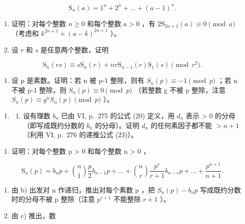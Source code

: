 \[
\mathrm{S} _ {n} (a) = 1 ^ {n} + 2 ^ {n} + \dots + (a - 1) ^ {n}.
\]

\begin{enumerate}
\def\labelenumi{\alph{enumi})}
\item
  证明：对每个整数 \(n \geqslant 0\) 和每个整数 \(a > 0\) ，有 \(2\mathrm{S}_{2n + 1}(a) \equiv 0 \pmod{a}\) （考虑和 \(k^{2n + 1} + (a - k)^{2n + 1}\) ）。
\item
  设 \(r\) 和 \(s\) 是任意两个整数，证明
\end{enumerate}

\[
\mathrm{S} _ {n} (r s) \equiv s \mathrm{S} _ {n} (r) + n r \mathrm{S} _ {n - 1} (r) \mathrm{S} _ {1} (s) \pmod {r ^ {2}}.
\]

\begin{enumerate}
\def\labelenumi{\alph{enumi})}
\setcounter{enumi}{2}
\tightlist
\item
  设 p 是素数。证明：若 n 被 p-1 整除，则有 \(S_{n}(p) \equiv -1 \pmod{p}\) ；若 n 不被 p-1 整除，则 \(S_{n}(p) \equiv 0 \pmod{p}\) （若整数 g 不被 p 整除，注意 \(S_{n}(p) \equiv g^{n}S_{n}(p) \pmod{p}\) ）。
\end{enumerate}

\begin{enumerate}
\def\labelenumi{\arabic{enumi})}
\setcounter{enumi}{5}
\tightlist
\item
  \begin{enumerate}
  \def\labelenumii{\alph{enumii})}
  \tightlist
  \item
    设有理数 \(b_{n}\) 已由 VI, p.~275 的公式 (20) 定义，用 \(d_{n}\) 表示 \textgreater{} 0 的分母（即写成既约分数的 \(b_{n}\) 的分母）。证明 \(d_{n}\) 的任何素因子都不能 \(> n + 1\) （利用 VI, p.~276 的递推公式 (23)）。
  \end{enumerate}
\end{enumerate}

\begin{enumerate}
\def\labelenumi{\alph{enumi})}
\setcounter{enumi}{1}
\tightlist
\item
  证明：对每个整数 p \textgreater{} 0 和每个整数 n \textgreater{} 0 ，
\end{enumerate}

\[
\mathrm{S} _ {n} (p) = b _ {n} p + \binom {n} {1} \frac {p}{2} b _ {n - 1} p + \dots + \binom {n} {r} \frac {p ^ {r}}{r + 1} b _ {n - r} p + \dots + \frac {p ^ {n + 1}}{n + 1}.
\]

\begin{enumerate}
\def\labelenumi{\alph{enumi})}
\setcounter{enumi}{2}
\item
  由 b) 出发对 n 作递归，推出对每个素数 p ，把 \(S_{n}(p) - b_{n}p\) 写成既约分数时的分母不被 p 整除（注意 \(p^{r+1}\) 不能整除 \(r + 1\) ）。
\item
  由 c) 推出，数
\end{enumerate}

